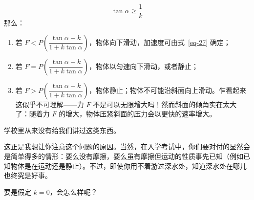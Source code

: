 \begin{dialogue}
\begin{enumerate}[label=\textbf{(\arabic*)},leftmargin=1cm]
\begin{equation*}
\tan \alpha \geqslant \frac{1}{k}
\end{equation*}
那么：
\begin{enumerate}[label=\textbf{(\alph*)},leftmargin=1cm]
\item 若 $F< P \left(\dfrac{\tan \alpha - k}{ 1 + k \tan \alpha}\right)$，物体向下滑动，加速度可由式~\eqref{eq-27} 确定；
\item 若 $F = P \left(\dfrac{\tan \alpha - k}{ 1 + k \tan \alpha}\right)$，物体以匀速向下滑动，或者静止；
\item 若 $F > P \left(\dfrac{\tan \alpha - k}{ 1 + k \tan \alpha}\right)$，物体静止；物体不可能沿斜面向上滑动。乍看起来这似乎不可理解——力 $F$ 不是可以无限增大吗！然而斜面的倾角实在太大了：随着力 $F$ 的增大，物体压紧斜面的压力会以更快的速率增大。
\end{enumerate}
\end{enumerate}

\std 学校里从来没有给我们讲过这类东西。

\tchr 这正是我想让你注意这个问题的原因。当然，在入学考试中，你们要对付的显然会是简单得多的情形：要么没有摩擦，要么虽有摩擦但运动的性质事先已知（例如已知物体是在运动还是静止）。不过，即使你用不着游过深水处，知道深水处在哪儿也终究是好事。

\std 要是假定 $k=0$，会怎么样呢？


\end{dialogue}
